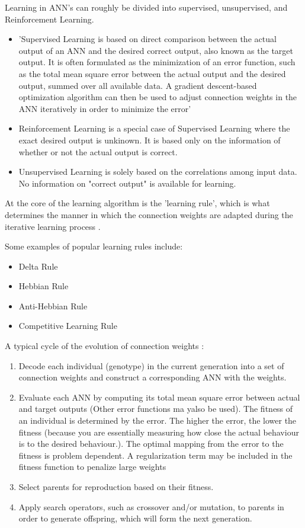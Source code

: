 Learning in ANN's can roughly be divided into supervised, unsupervised, and Reinforcement Learning.
\begin{itemize}
	\item 'Supervised Learning is based on direct comparison between the actual output of an ANN and the desired correct output, also known as the target output. It is often formulated as the minimization of an error function, such as the total mean square error between the actual output and the desired output, summed over all available data. A gradient descent-based optimization algorithm can then be used to adjust connection weights in the ANN iteratively in order to minimize the error'
	\item Reinforcement Learning is a special case of Supervised Learning where the exact desired output is unkinown. It is based only on the information of whether or not the actual output is correct.
	\item Unsupervised Learning is solely based on the correlations among input data. No information on "correct output" is available for learning.
\end{itemize}

At the core of the learning algorithm is the 'learning rule', which is what determines the manner in which the connection weights are adapted during the iterative learning process \cite{XinYao1999}.

Some examples of popular learning rules include:
\begin{itemize}
	\item Delta Rule
	\item Hebbian Rule
	\item Anti-Hebbian Rule
	\item Competitive Learning Rule
\end{itemize}


A typical cycle of the evolution of connection weights \cite{XinYao1999}:
\begin{enumerate}
	\item Decode each individual (genotype) in the current generation into a set of connection weights and construct a corresponding ANN with the weights.
	\item Evaluate each ANN by computing its total mean square error between actual and target outputs (Other error functions ma yalso be used). The fitness of an individual is determined by the error. The higher the error, the lower the fitness (because you are essentially measuring how close the actual behaviour is to the desired behaviour.). The optimal mapping from the error to the fitness is problem dependent. A regularization term may be included in the fitness function to penalize large weights
	\item Select parents for reproduction based on their fitness.
	\item Apply search operators, such as crossover and/or mutation, to parents in order to generate offspring, which will form the next generation.
\end{enumerate}

